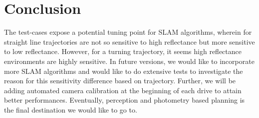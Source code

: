 \documentclass[a4paper, 10pt, conference]{ieeeconf}      %
\begin{document}
\section{Conclusion}
The test-cases expose a potential tuning point for SLAM algorithms, wherein for straight line trajectories are not so sensitive to high reflectance but more sensitive to low reflectance. However, for a turning trajectory, it seems high reflectance environments are highly sensitive. In future versions, we would like to incorporate more SLAM algorithms and would like to do extensive tests to investigate the reason for this sensitivity difference based on trajectory. Further, we will be adding automated camera calibration at the beginning of each drive to attain better performances. Eventually, perception and photometry based planning is the final destination we would like to go to.



\end{document}
